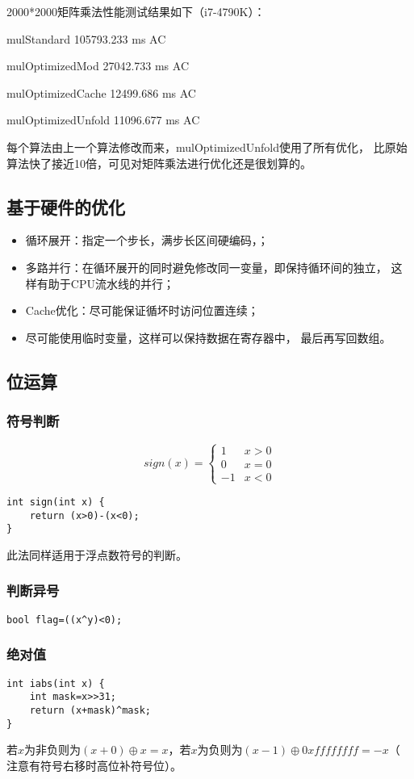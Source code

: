 2000*2000矩阵乘法性能测试结果如下（i7-4790K）：

mulStandard 105793.233 ms AC

mulOptimizedMod 27042.733 ms AC

mulOptimizedCache 12499.686 ms AC

mulOptimizedUnfold 11096.677 ms AC

每个算法由上一个算法修改而来，mulOptimizedUnfold使用了所有优化，
比原始算法快了接近10倍，可见对矩阵乘法进行优化还是很划算的。
\subsection{基于硬件的优化}
\begin{itemize}
    \item 循环展开：指定一个步长，满步长区间硬编码，；
    \item 多路并行：在循环展开的同时避免修改同一变量，即保持循环间的独立，
    这样有助于CPU流水线的并行；
    \item Cache优化：尽可能保证循坏时访问位置连续；
    \item 尽可能使用临时变量，这样可以保持数据在寄存器中，
    最后再写回数组。
\end{itemize}
\subsection{位运算}
\subsubsection{符号判断}
\begin{displaymath}
    sign(x)=\left\{\begin{array}{cc}
        1&x>0\\
        0&x=0\\
        -1&x<0
    \end{array}\right.
\end{displaymath}
\begin{lstlisting}
int sign(int x) {
    return (x>0)-(x<0);
}
\end{lstlisting}
此法同样适用于浮点数符号的判断。
\subsubsection{判断异号}
\begin{lstlisting}
bool flag=((x^y)<0);
\end{lstlisting}
\subsubsection{绝对值}
\begin{lstlisting}
int iabs(int x) {
    int mask=x>>31;
    return (x+mask)^mask;
}
\end{lstlisting}
若$x$为非负则为$(x+0)\oplus x=x$，若$x$为负则为$(x-1)\oplus 0xffffffff=-x$（
注意有符号右移时高位补符号位）。
